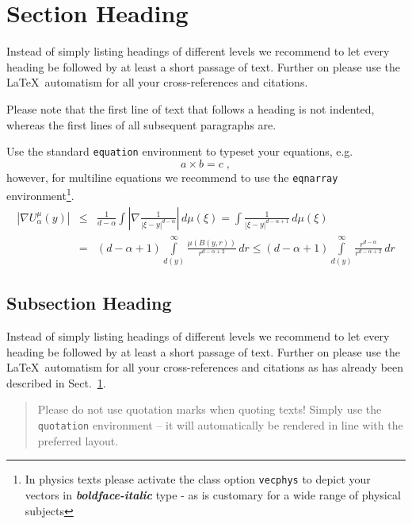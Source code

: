 \documentclass[graybox]{svmult}
\begin{document}
\section{Section Heading}
\label{sec:2}

Instead of simply listing headings of different levels we recommend to let every heading be followed by at least a short passage of text.  Further on please use the \LaTeX\ automatism for all your cross-references and citations.

Please note that the first line of text that follows a heading is not indented, whereas the first lines of all subsequent paragraphs are.

Use the standard \verb|equation| environment to typeset your equations, e.g.
%
\begin{equation}
a \times b = c\;,
\end{equation}
%
however, for multiline equations we recommend to use the \verb|eqnarray| environment\footnote{In physics texts please activate the class option \texttt{vecphys} to depict your vectors in \textbf{\itshape boldface-italic} type - as is customary for a wide range of physical subjects}.
\begin{eqnarray}
\left|\nabla U_{\alpha}^{\mu}(y)\right| &\le&\frac1{d-\alpha}\int
\left|\nabla\frac1{|\xi-y|^{d-\alpha}}\right|\,d\mu(\xi) =
\int \frac1{|\xi-y|^{d-\alpha+1}} \,d\mu(\xi)  \\
&=&(d-\alpha+1) \int\limits_{d(y)}^\infty
\frac{\mu(B(y,r))}{r^{d-\alpha+2}}\,dr \le (d-\alpha+1)
\int\limits_{d(y)}^\infty \frac{r^{d-\alpha}}{r^{d-\alpha+2}}\,dr
\label{eq:01}
\end{eqnarray}

\subsection{Subsection Heading}
\label{subsec:2}
Instead of simply listing headings of different levels we recommend to let every heading be followed by at least a short passage of text.  Further on please use the \LaTeX\ automatism for all your cross-references and citations as has already been described in Sect.~\ref{sec:2}.

\begin{quotation}
Please do not use quotation marks when quoting texts! Simply use the \verb|quotation| environment -- it will automatically be rendered in line with the preferred layout.
\end{quotation}
\end{document}
